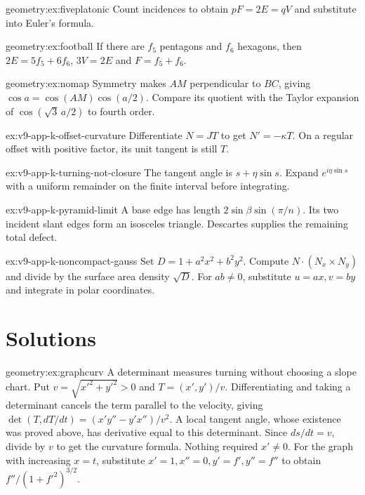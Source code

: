 \begin{hint}{geometry:ex:fiveplatonic}
Count incidences to obtain $pF=2E=qV$ and substitute into Euler's formula.
\end{hint}
\begin{hint}{geometry:ex:football}
If there are $f_5$ pentagons and $f_6$ hexagons, then $2E=5f_5+6f_6$, $3V=2E$ and $F=f_5+f_6$.
\end{hint}
\begin{hint}{geometry:ex:nomap}
Symmetry makes $AM$ perpendicular to $BC$, giving $\cos a=\cos(AM)\cos(a/2)$. Compare its quotient with the Taylor expansion of $\cos(\sqrt3\,a/2)$ to fourth order.
\end{hint}
\begin{hint}{ex:v9-app-k-offset-curvature}
Differentiate $N=JT$ to get $N'=-\kappa T$. On a regular offset with positive factor, its unit tangent is still $T$.
\end{hint}
\begin{hint}{ex:v9-app-k-turning-not-closure}
The tangent angle is $s+\eta\sin s$. Expand $e^{i\eta\sin s}$ with a uniform remainder on the finite interval before integrating.
\end{hint}
\begin{hint}{ex:v9-app-k-pyramid-limit}
A base edge has length $2\sin\beta\sin(\pi/n)$. Its two incident slant edges form an isosceles triangle. Descartes supplies the remaining total defect.
\end{hint}
\begin{hint}{ex:v9-app-k-noncompact-gauss}
Set $D=1+a^2x^2+b^2y^2$. Compute $N\cdot(N_x\times N_y)$ and divide by the surface area density $\sqrt D$. For $ab\ne0$, substitute $u=ax,v=by$ and integrate in polar coordinates.
\end{hint}

\section{Solutions}

\begin{solution}{geometry:ex:graphcurv}
\idea A determinant measures turning without choosing a slope chart.
\writeup Put $v=\sqrt{x'^2+y'^2}>0$ and $T=(x',y')/v$. Differentiating and taking a determinant cancels the term parallel to the velocity, giving
$\det(T,dT/dt)=(x'y''-y'x'')/v^2$. A local tangent angle, whose existence was proved above, has derivative equal to this determinant. Since $ds/dt=v$, divide by $v$ to get the curvature formula. Nothing required $x'\ne0$. For the graph with increasing $x=t$, substitute $x'=1,x''=0,y'=f',y''=f''$ to obtain $f''/(1+f'^2)^{3/2}$.
\end{solution}

